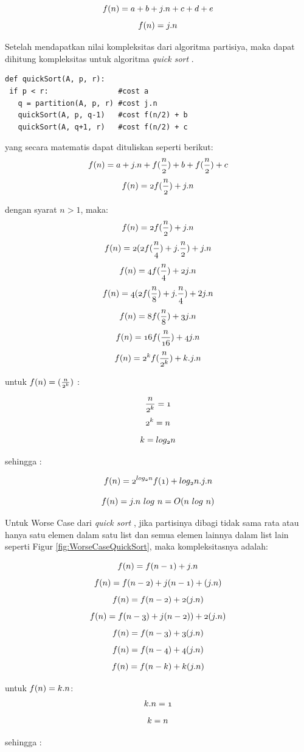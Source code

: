 $$ \mathnormal{f(n) = a+b+j.n+c+d+e} $$
$$ \mathnormal{f(n) = j.n} $$

Setelah mendapatkan nilai kompleksitas dari algoritma partisiya, maka dapat dihitung kompleksitas untuk algoritma \textit{quick sort} .

\lstset{language=Python}
\label{lst:QuickSort}
\begin{lstlisting}[frame=single]
def quickSort(A, p, r):
 if p < r:                #cost a
   q = partition(A, p, r) #cost j.n
   quickSort(A, p, q-1)   #cost f(n/2) + b
   quickSort(A, q+1, r)   #cost f(n/2) + c
\end{lstlisting}

yang secara matematis dapat dituliskan seperti berikut:
$$	  \mathnormal{f(n) = a+j.n+f(\frac{n}{2})+b+f(\frac{n}{2})+c } $$
$$	  \mathnormal{f(n) = 2f(\frac{n}{2})+j.n } $$

dengan syarat $n > 1$, maka:
$$	  \mathnormal{f(n) = 2f(\frac{n}{2})+j.n } $$
$$	  \mathnormal{f(n) = 2(2f(\frac{n}{4})+j.\frac{n}{2} )} + j.n $$
$$	  \mathnormal{f(n) = 4f(\frac{n}{4})+2j.n } $$
$$	  \mathnormal{f(n) = 4(2f(\frac{n}{8})+j.\frac{n}{4} )}+2j.n $$
$$	  \mathnormal{f(n) = 8f(\frac{n}{8})+3j.n } $$
$$	  \mathnormal{f(n) = 16f(\frac{n}{16})+4j.n } $$
$$	  \mathnormal{f(n) = 2^{k}f(\frac{n}{2^{k}})+k.j.n } $$

untuk $ \mathnormal{f(n) = (\frac{n}{2^{k}})} $ :

$$ \mathnormal{\frac{n}{2^{k}}=1} $$
$$ \mathnormal{2^{k}=n} $$
$$ \mathnormal{k=log_{2}n} $$

sehingga :

$$	  \mathnormal{f(n) = 2^{log_{2}n}f(1)+log_{2}n.j.n } $$

$$	  \mathnormal{f(n) = j.n\ log\ n = O(n\ log\ n)} $$

Untuk Worse Case dari \textit{quick sort} , jika partisinya dibagi tidak sama rata atau hanya satu elemen dalam satu list dan semua elemen lainnya dalam list lain seperti Figur \ref{fig:WorseCaseQuickSort}, maka kompleksitasnya adalah:

$$	  \mathnormal{f(n) = f(n-1)+j.n} $$
$$	  \mathnormal{f(n) = f(n-2)+j(n-1)+(j.n)} $$
$$	  \mathnormal{f(n) = f(n-2)+2(j.n)} $$
$$	  \mathnormal{f(n) = f(n-3)+j(n-2))+2(j.n)} $$
$$	  \mathnormal{f(n) = f(n-3)+3(j.n)} $$
$$	  \mathnormal{f(n) = f(n-4)+4(j.n)} $$
$$	  \mathnormal{f(n) = f(n-k)+k(j.n)} $$

untuk $ \mathnormal{f(n) = k.n  }$:
$$ \mathnormal{ k.n = 1  }$$
$$ \mathnormal{ k = n }$$

sehingga :

